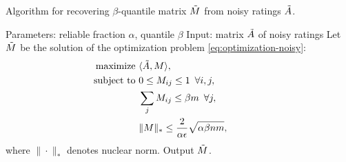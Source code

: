 \begin{algorithm}[b!]
\caption{Algorithm for recovering $\beta$-quantile matrix $\tilde{M}$ from 
noisy ratings $\tilde{A}$.}
\label{alg:recover-M}
\begin{algorithmic}
\STATE Parameters: reliable fraction $\alpha$, quantile $\beta$
\STATE Input: matrix $\tilde{A}$ of noisy ratings
\STATE Let $\tilde{M}$ be the solution of the optimization problem \eqref{eq:optimization-noisy}:
  \begin{align}
  \label{eq:optimization-noisy}
  \text{maximize } &\langle \tilde{A}, M \rangle, \\
  \notag \text{ subject to } &0 \leq M_{ij} \leq 1 \,\,\, \forall i,j, \\
  \notag                     &\sum_{j} M_{ij} \leq \beta m \,\,\, \forall j, \\
  \notag                    &\|M\|_* \leq \frac{2}{\alpha\epsilon}\sqrt{\alpha\beta nm}, \phantom{xxxxxxx}
  \end{align}
  where $\|\cdot\|_*$ denotes nuclear norm.
\STATE Output $\tilde{M}$.
\end{algorithmic}
\end{algorithm}
